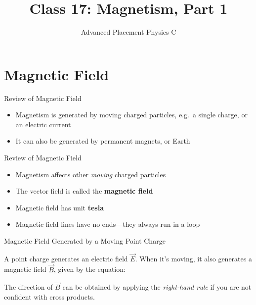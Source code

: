 \documentclass[12pt,aspectratio=169]{beamer}
\title{Class 17: Magnetism, Part 1}
\subtitle{Advanced Placement Physics C}
\begin{document}
\begin{frame}
  \maketitle
\end{frame}


\section{Magnetic Field}

\begin{frame}{Review of Magnetic Field}
  \begin{itemize}
  \item Magnetism is generated by moving charged particles, e.g.\ a single
    charge, or an electric current
  \item It can also be generated by permanent magnets, or Earth
  \end{itemize}
\end{frame}



\begin{frame}{Review of Magnetic Field}
  \begin{itemize}
  \item Magnetism affects other \emph{moving} charged particles
  \item The vector field is called the \textbf{magnetic field}
  \item Magnetic field has unit \textbf{tesla}
  \item Magnetic field lines have no ends---they always run in a loop
  \end{itemize}
\end{frame}



\begin{frame}{Magnetic Field Generated by a Moving Point Charge}
  \begin{center}
  \end{center}
  A point charge generates an electric field $\vec E$. When it's moving, it
  also generates a magnetic field $\vec B$, given by the equation:


  The direction of $\vec B$ can be obtained by applying the
  \emph{right-hand rule} if you are not confident with cross products.
\end{frame}
\end{document}
